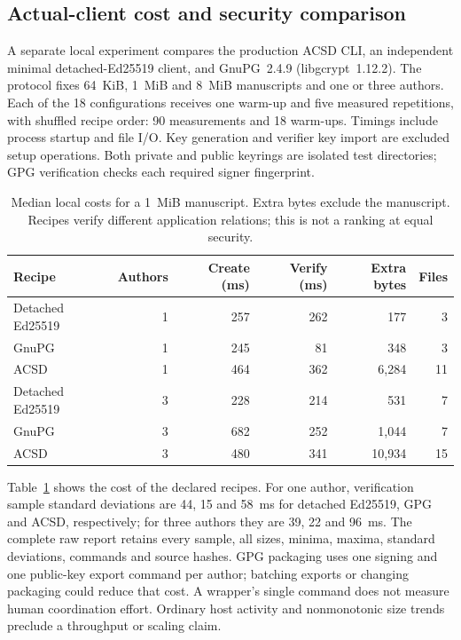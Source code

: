 \documentclass[conference,compsoc]{IEEEtran}
\begin{document}
\subsection{Actual-client cost and security comparison}
\label{sec:comparison}

A separate local experiment compares the production ACSD CLI, an independent
minimal detached-Ed25519 client, and GnuPG~2.4.9 (libgcrypt~1.12.2).
The protocol fixes 64~KiB, 1~MiB and 8~MiB manuscripts and one or three authors.
Each of the 18 configurations receives one warm-up and five measured repetitions,
with shuffled recipe order: 90 measurements and 18 warm-ups. Timings include
process startup and file I/O. Key generation and verifier key import are
excluded setup operations. Both private and public keyrings are isolated test
directories; GPG verification checks each required signer fingerprint.

\begin{table}[t]
\centering\small
\begin{tabular}{lrrrrr}
\toprule
Recipe & Authors & Create (ms) & Verify (ms) & Extra bytes & Files \\
\midrule
Detached Ed25519 & 1 & 257 & 262 & 177 & 3 \\
GnuPG & 1 & 245 & 81 & 348 & 3 \\
ACSD & 1 & 464 & 362 & 6,284 & 11 \\
Detached Ed25519 & 3 & 228 & 214 & 531 & 7 \\
GnuPG & 3 & 682 & 252 & 1,044 & 7 \\
ACSD & 3 & 480 & 341 & 10,934 & 15 \\
\bottomrule
\end{tabular}
\caption{Median local costs for a 1~MiB manuscript. Extra bytes exclude the
manuscript. Recipes verify different application relations; this is not a
ranking at equal security.}
\label{tab:client-cost}
\end{table}

Table~\ref{tab:client-cost} shows the cost of the declared recipes.
For one author, verification sample standard deviations are 44, 15 and 58~ms
for detached Ed25519, GPG and ACSD, respectively; for three authors they are
39, 22 and 96~ms. The complete raw report retains every sample, all sizes,
minima, maxima, standard deviations, commands and source hashes.
GPG packaging uses one signing and one public-key export command per author;
batching exports or changing packaging could reduce that cost. A wrapper's
single command does not measure human coordination effort. Ordinary host
activity and nonmonotonic size trends preclude a throughput or scaling claim.
\end{document}
